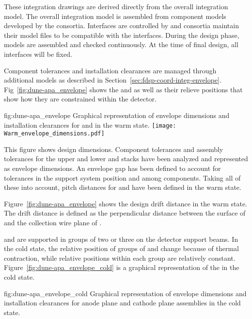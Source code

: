 These integration drawings are derived directly from the overall
integration model. The overall integration model is assembled from
component models developed by the consortia. Interfaces are controlled
by  and consortia maintain their model files to be
compatible with the interfaces. During the design phase, models are
assembled and checked continuously. At the time of final design, all
interfaces will be fixed.


Component tolerances and installation clearances are managed through
additional models as described in
Section~\ref{sec:fdsp-coord-integ-envelope}.
Fig~\ref{fig:dune-apa_envelope} shows the  and
 as well as their relieve positions that show how they are
constrained within the detector.
\begin{dunefigure}{fig:dune-apa_envelope} {Graphical
    representation of envelope dimensions and installation clearances
    for  and  in the warm state.}
  \texttt{[image: Warm\_envelope\_dimensions.pdf]}
\end{dunefigure}


This figure shows design dimensions. Component tolerances and assembly
tolerances for the upper and lower  and  stacks
have been analyzed and represented as envelope dimensions. An envelope
gap has been defined to account for tolerances in the support system
position and among components. Taking all of these into account, pitch
distances for  and  have been defined in the
warm state.


Figure~\ref{fig:dune-apa_envelope} shows the design drift distance in
the warm state. The drift distance is defined as the perpendicular
distance between the surface of  and the collection wire
plane of .




 and  are supported in groups of two or three
on the detector support beams.  In the cold state, the relative
position of groups of  and  change because of
thermal contraction, while relative positions within each group are
relatively constant. Figure~\ref{fig:dune-apa_envelope_cold} is a
graphical representation of the  in the cold state. 
\begin{dunefigure}{fig:dune-apa_envelope_cold} {Graphical
    representation of envelope dimensions and installation clearances
    for anode plane and cathode plane assemblies in the cold state.}
\end{dunefigure}


